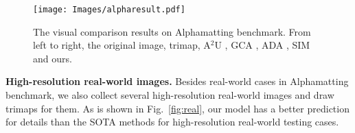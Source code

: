 \documentclass[10pt,twocolumn,letterpaper]{article}
\begin{document}
\begin{figure*}[t]
	\centering
	\texttt{[image: Images/alpharesult.pdf]}
	\caption{The visual comparison results on Alphamatting benchmark. From left to right, the original image, trimap, A$^{2}$U \cite{a2u}, GCA \cite{gca}, ADA \cite{adamatting}, SIM \cite{sim} and ours. }
	\label{fig:alpharesult}
\end{figure*}

\textbf{High-resolution real-world images.} Besides real-world cases in Alphamatting \cite{alphamatting} benchmark, we also collect  several high-resolution real-world images and  draw trimaps for them. As is shown in Fig.~\ref{fig:real}, our model has a better prediction for details than the SOTA methods \cite{deepmatting,indexnet,gca} for high-resolution real-world testing cases.
\end{document}
